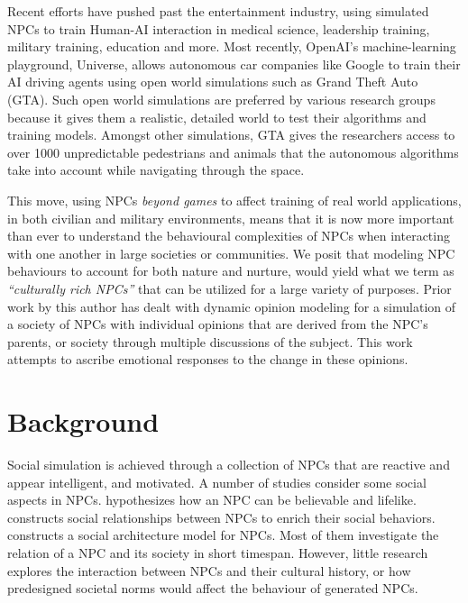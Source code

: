 \documentclass[letterpaper]{article}
\begin{document}
Recent efforts have pushed past the entertainment industry, using simulated NPCs to train Human-AI interaction in medical science\cite{bartoli2012emergency}, leadership training\cite{riedl2006believable,swartout2006toward}, military training\cite{banta2004virtual}, education\cite{vanlehn1996conceptual} and more. Most recently, OpenAI’s machine-learning playground, Universe, allows autonomous car companies like Google to train their AI driving agents using open world simulations such as Grand Theft Auto (GTA)\cite{openai_2017}. Such open world simulations are preferred by various research groups because it gives them a realistic, detailed world to test their algorithms and training models. Amongst other simulations, GTA gives the researchers access to over 1000 unpredictable pedestrians and animals that the autonomous algorithms take into account while navigating through the space\cite{openai_2017,selfdrivinggta_2016}. 

This move, using NPCs \textit{beyond games} to affect training of real world applications, in both civilian and military environments, means that it is now more important than ever to understand the behavioural complexities of NPCs when interacting with one another in large societies or communities. We posit that modeling NPC behaviours to account for both nature and nurture, would yield what we term as \textit{``culturally rich NPCs''} that can be utilized for a large variety of purposes. 
Prior work by this author has dealt with dynamic opinion modeling for a simulation of a society of NPCs with individual opinions that are derived from the NPC's parents, or society through multiple discussions of the subject. This work attempts to ascribe emotional responses to the change in these opinions. 

\section{Background} 
Social simulation is achieved through a collection of NPCs that are reactive and appear intelligent, and motivated\cite{riedl2006believable,mateas2003faccade}. A number of studies consider some social aspects in NPCs. \citeauthor{verhagen2013social} hypothesizes how an NPC can be believable and lifelike. \citeauthor{afonso2008agents} constructs social relationships between NPCs to enrich their social behaviors. \citeauthor{guimaraes2017prom} constructs a social architecture model for NPCs. Most of them investigate the relation of a NPC and its society in short timespan. However, little research explores the interaction between NPCs and their cultural history, or how predesigned societal norms would affect the behaviour of generated NPCs. 
\end{document}
